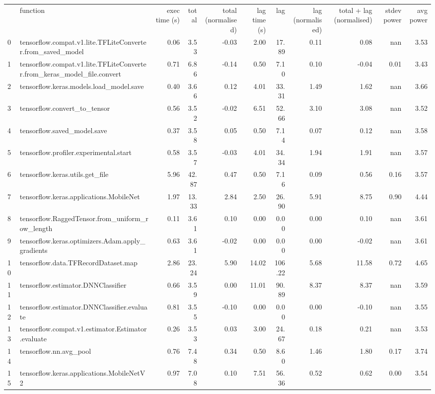 \begin{tabular}{llrrrrrrrrr}
 & function & exec time (s) & total & total (normalised) & lag time (s) & lag & lag (normalised) & total + lag (normalised) & stdev power & avg power \\
0 & tensorflow.compat.v1.lite.TFLiteConverter.from_saved_model & 0.06 & 3.53 & -0.03 & 2.00 & 17.89 & 0.11 & 0.08 & nan & 3.53 \\
1 & tensorflow.compat.v1.lite.TFLiteConverter.from_keras_model_file.convert & 0.71 & 6.86 & -0.14 & 0.50 & 7.10 & 0.10 & -0.04 & 0.01 & 3.43 \\
2 & tensorflow.keras.models.load_model.save & 0.40 & 3.66 & 0.12 & 4.01 & 33.31 & 1.49 & 1.62 & nan & 3.66 \\
3 & tensorflow.convert_to_tensor & 0.56 & 3.52 & -0.02 & 6.51 & 52.66 & 3.10 & 3.08 & nan & 3.52 \\
4 & tensorflow.saved_model.save & 0.37 & 3.58 & 0.05 & 0.50 & 7.14 & 0.07 & 0.12 & nan & 3.58 \\
5 & tensorflow.profiler.experimental.start & 0.58 & 3.57 & -0.03 & 4.01 & 34.34 & 1.94 & 1.91 & nan & 3.57 \\
6 & tensorflow.keras.utils.get_file & 5.96 & 42.87 & 0.47 & 0.50 & 7.16 & 0.09 & 0.56 & 0.16 & 3.57 \\
7 & tensorflow.keras.applications.MobileNet & 1.97 & 13.33 & 2.84 & 2.50 & 26.90 & 5.91 & 8.75 & 0.90 & 4.44 \\
8 & tensorflow.RaggedTensor.from_uniform_row_length & 0.11 & 3.61 & 0.10 & 0.00 & 0.00 & 0.00 & 0.10 & nan & 3.61 \\
9 & tensorflow.keras.optimizers.Adam.apply_gradients & 0.63 & 3.61 & -0.02 & 0.00 & 0.00 & 0.00 & -0.02 & nan & 3.61 \\
10 & tensorflow.data.TFRecordDataset.map & 2.86 & 23.24 & 5.90 & 14.02 & 106.22 & 5.68 & 11.58 & 0.72 & 4.65 \\
11 & tensorflow.estimator.DNNClassifier & 0.66 & 3.59 & 0.00 & 11.01 & 90.89 & 8.37 & 8.37 & nan & 3.59 \\
12 & tensorflow.estimator.DNNClassifier.evaluate & 0.81 & 3.55 & -0.10 & 0.00 & 0.00 & 0.00 & -0.10 & nan & 3.55 \\
13 & tensorflow.compat.v1.estimator.Estimator.evaluate & 0.26 & 3.53 & 0.03 & 3.00 & 24.67 & 0.18 & 0.21 & nan & 3.53 \\
14 & tensorflow.nn.avg_pool & 0.76 & 7.48 & 0.34 & 0.50 & 8.60 & 1.46 & 1.80 & 0.17 & 3.74 \\
15 & tensorflow.keras.applications.MobileNetV2 & 0.97 & 7.08 & 0.10 & 7.51 & 56.36 & 0.52 & 0.62 & 0.00 & 3.54 \\

\end{tabular}
